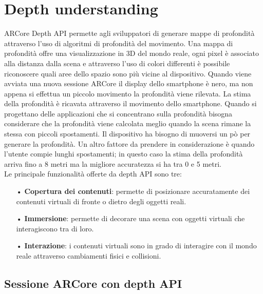 \documentclass[crop=false, class=book]{standalone}
\begin{document}
		
	\chapter{Depth understanding}
	
		ARCore Depth API  permette agli sviluppatori di generare mappe di profondità attraverso l'uso di algoritmi di 					profondità del movimento. Una mappa di profondità offre una visualizzazione in 3D del mondo reale, ogni pixel è 				associato alla distanza dalla scena e attraverso l'uso di colori differenti è possibile riconoscere quali aree dello 			spazio sono più vicine al dispositivo. Quando viene avviata una nuova sessione ARCore il display dello smartphone è 			nero, ma non appena si effettua un piccolo movimento la profondità viene rilevata. La stima della profondità è ricavata 		attraverso il movimento dello smartphone. Quando si progettano delle applicazioni che si concentrano sulla profondità 			bisogna considerare che la profondità viene calcolata meglio quando la scena rimane la stessa con piccoli spostamenti. 			Il dispositivo ha bisogno di muoversi un pò per generare la profondità. Un altro fattore da prendere in considerazione 			è quando l'utente compie lunghi spostamenti; in questo caso la stima della profondità arriva fino a 8 metri ma la 				migliore accuratezza si ha tra 0 e 5 metri.\\
		 Le principale funzionalità offerte da depth API sono tre:
		
		\begin{itemize}
			\item[•] \textbf{Copertura dei contenuti}: permette di posizionare accuratamente dei contenuti virtuali di fronte o dietro degli oggetti reali.
			\item[•] \textbf{Immersione}: permette di decorare una scena con oggetti virtuali che interagiscono tra di loro.
			\item[•] \textbf{Interazione}: i contenuti virtuali sono in grado di interagire con il mondo reale attraverso cambiamenti fisici e collisioni.
		\end{itemize}
		
		\section{Sessione ARCore con depth API}
		
\end{document}
